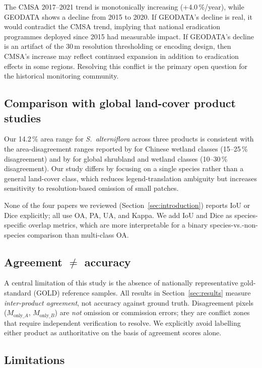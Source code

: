\documentclass[11pt]{article}
\begin{document}
The CMSA 2017--2021 trend is monotonically increasing (+4.0\,\%/year), while
GEODATA shows a decline from 2015 to 2020. If GEODATA's decline is real, it
would contradict the CMSA trend, implying that national eradication programmes
deployed since 2015 had measurable impact. If GEODATA's decline is an artifact
of the 30\,m resolution thresholding or encoding design, then CMSA's increase
may reflect continued expansion in addition to eradication effects in some
regions. Resolving this conflict is the primary open question for the
historical monitoring community.

\subsection{Comparison with global land-cover product studies}

Our 14.2\,\% area range for \textit{S.~alterniflora} across three products is
consistent with the area-disagreement ranges reported by \citet{wang_2024_ijde}
for Chinese wetland classes (15--25\,\% disagreement) and by \citet{zhao_2023_rs}
for global shrubland and wetland classes (10--30\,\% disagreement). Our study
differs by focusing on a single species rather than a general land-cover class,
which reduces legend-translation ambiguity but increases sensitivity to
resolution-based omission of small patches.

None of the four papers we reviewed (Section~\ref{sec:introduction}) reports IoU
or Dice explicitly; all use OA, PA, UA, and Kappa. We add IoU and Dice as
species-specific overlap metrics, which are more interpretable for a binary
species-vs.-non-species comparison than multi-class OA.

\subsection{Agreement $\neq$ accuracy}

A central limitation of this study is the absence of nationally representative
gold-standard (GOLD) reference samples. All results in Section~\ref{sec:results}
measure \emph{inter-product agreement}, not accuracy against ground truth.
Disagreement pixels ($M_{\text{only}\_A}$, $M_{\text{only}\_B}$) are \emph{not}
omission or commission errors; they are conflict zones that require independent
verification to resolve. We explicitly avoid labelling either product as
authoritative on the basis of agreement scores alone.

\subsection{Limitations}
\end{document}
